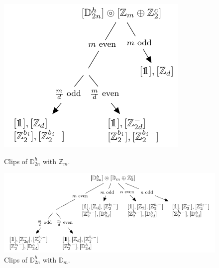 \documentclass[11pt,a4paper]{amsart}
\theoremstyle{definition}
\newcommand{\ZZ}{\mathbb{Z}}                %
\newcommand{\DD}{\mathbb{D}}                %
\newcommand{\1}{\mathds{1}}		            %
\begin{document}
\begin{figure}[h!]
	\begin{minipage}[b]{0.5\linewidth}
		\centering \includegraphics[width=0.6\linewidth]{"Figures piezo/graphe11'"}
		\caption{Clips of $\DD_{2n}^h$ with $\ZZ_m$.}
		\label{fig:graphe11}
	\end{minipage}\hfill
	\begin{minipage}[b]{0.5\linewidth}
		\centering \includegraphics[width=1.2\linewidth]{"Figures piezo/graphe12'"}
		\caption{Clips of $\DD_{2n}^h$ with $\DD_m$.}
		\label{fig:graphe12}
	\end{minipage}
\end{figure}
\end{document}
